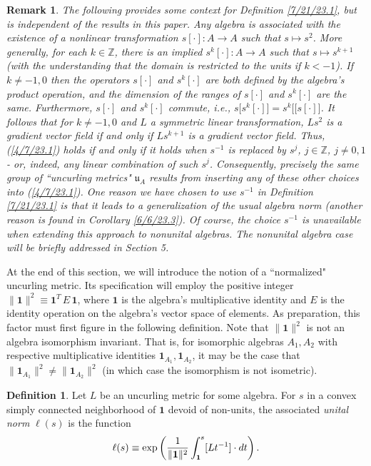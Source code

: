 \documentclass{amsart}
\numberwithin{equation}{section}
\newtheorem{remark}[theorem]{Remark}
\theoremstyle{definition}
\newtheorem{definition}[theorem]{Definition}
\numberwithin{theorem}{section}
\begin{document}
   
\begin{remark} {\rm The following provides some context for Definition \ref{7/21/23.1}, but is independent of the results in this paper.  Any algebra is associated with the existence of a nonlinear transformation $s[\cdot]:A\rightarrow A$ such that $s\mapsto s^2$.  More generally, for each $k\in \mathbb{Z}$, there is an implied $s^k[\cdot]:A\rightarrow A$ such that $s\mapsto s^{k+1}$ (with the understanding that the domain is restricted to the units if $k<-1$).  If $k\ne -1, 0$ then the operators $s[\cdot]$ and $s^k[\cdot]$ are both defined by the algebra's product operation, and the dimension of the ranges of $s[\cdot]$ and $s^k[\cdot]$ are the same.   Furthermore, $s[\cdot]$ and $s^k[\cdot]$ commute, i.e., $s\big[s^k[\cdot]\big] = s^k\big[[s[\cdot]\big]$.  It follows that for $k\ne -1,0$ and $L$ a symmetric linear transformation, $Ls^2$ is a gradient vector field if and only if $Ls^{k+1}$ is a gradient vector field.  Thus, (\ref{4/7/23.1}) holds if and only if it holds when $s^{-1}$ is replaced by $s^j$, $j\in \mathbb{Z}$, $j\ne 0,1$ - or, indeed, any linear combination of such $s^j$.  Consequently, precisely the same group of ``uncurling metrics" $\mathfrak{u}_A$ results from inserting any of these other choices into (\ref{4/7/23.1}). One reason we have chosen to use $s^{-1}$ in Definition \ref{7/21/23.1} is that it leads to a generalization of the usual algebra norm (another reason is found in Corollary \ref{6/6/23.3}).  Of course, the choice $s^{-1}$ is unavailable when extending this approach to nonunital algebras.  The nonunital algebra case will be briefly addressed in Section 5. } \end{remark}

  
At the end of this section, we will introduce the notion of a ``normalized" uncurling metric.  Its specification will employ the  positive integer $\|\mathbf{1}\|^2 \equiv \mathbf{1}^T \,E\, \mathbf{1}$, where $\mathbf{1}$ is the algebra's multiplicative identity and $E$ is the identity operation on the algebra's vector space of elements. As preparation, this factor must first figure in the following definition.  Note that $\|\mathbf{1}\|^2$ is not an algebra isomorphism invariant.  That is, for isomorphic algebras $A_1,A_2$ with respective multiplicative identities $\mathbf{1}_{A_1}, \mathbf{1}_{A_2}$, it may be the case that $\|\mathbf{1}_{A_1}\|^2 \ne \|\mathbf{1}_{A_2}\|^2$ (in which case the isomorphism is not isometric).

  
  
  \begin{definition} Let $L$ be an uncurling metric for some algebra.  For $s$ in a convex simply connected neighborhood of $\mathbf{1}$ devoid of non-units, the associated {\it unital norm} $ \ell(s)$ is the function
  \begin{equation}\label{11/7/20.2}   \ell(s) \equiv \exp\left({\frac{1}{\|{\bf 1}\|^2}\int_{\bf 1}^s [Lt^{-1}]\cdot dt}\right).\end{equation}\end{definition}  
  
\end{document}
